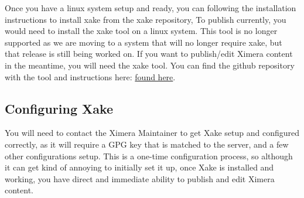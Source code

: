 \documentclass{ximera}
\begin{document}
        Once you have a linux system setup and ready, you can following the installation instructions to install xake from the xake repository, To publish currently, you would need to install the xake tool on a linux system. This tool is no longer supported as we are moving to a system that will no longer require xake, but that release is still being worked on. If you want to publish/edit Ximera content in the meantime, you will need the xake tool. You can find the github repository with the tool and instructions here:
        \href{https://github.com/XimeraProject/xake}{found here}.
        
    \subsection{Configuring Xake}
        
        You will need to contact the Ximera Maintainer to get Xake setup and configured correctly, as it will require a GPG key that is matched to the server, and a few other configurations setup. This is a one-time configuration process, so although it can get kind of annoying to initially set it up, once Xake is installed and working, you have direct and immediate ability to publish and edit Ximera content.
\end{document}
